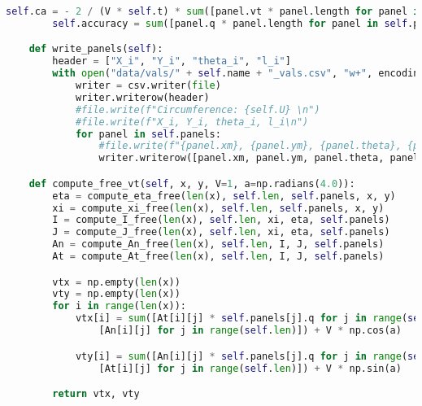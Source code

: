 \begin{lstlisting}[language=Python]
        self.ca = - 2 / (V * self.t) * sum([panel.vt * panel.length for panel in self.panels])
        self.accuracy = sum([panel.q * panel.length for panel in self.panels])

    def write_panels(self):
        header = ["X_i", "Y_i", "theta_i", "l_i"]
        with open("data/vals/" + self.name + "_vals.csv", "w+", encoding='UTF8',newline="") as file:
            writer = csv.writer(file)
            writer.writerow(header)
            #file.write(f"Circumference: {self.U} \n")
            #file.write(f"X_i, Y_i, theta_i, l_i\n")
            for panel in self.panels:
                #file.write(f"{panel.xm}, {panel.ym}, {panel.theta}, {panel.length}\n")
                writer.writerow([panel.xm, panel.ym, panel.theta, panel.length])

    def compute_free_vt(self, x, y, V=1, a=np.radians(4.0)):
        eta = compute_eta_free(len(x), self.len, self.panels, x, y)
        xi = compute_xi_free(len(x), self.len, self.panels, x, y)
        I = compute_I_free(len(x), self.len, xi, eta, self.panels)
        J = compute_J_free(len(x), self.len, xi, eta, self.panels)
        An = compute_An_free(len(x), self.len, I, J, self.panels)
        At = compute_At_free(len(x), self.len, I, J, self.panels)

        vtx = np.empty(len(x))
        vty = np.empty(len(x))
        for i in range(len(x)):
            vtx[i] = sum([At[i][j] * self.panels[j].q for j in range(self.len)]) - self.gamma * sum(
                [An[i][j] for j in range(self.len)]) + V * np.cos(a)

            vty[i] = sum([An[i][j] * self.panels[j].q for j in range(self.len)]) + self.gamma * sum(
                [At[i][j] for j in range(self.len)]) + V * np.sin(a)

        return vtx, vty
\end{lstlisting}




